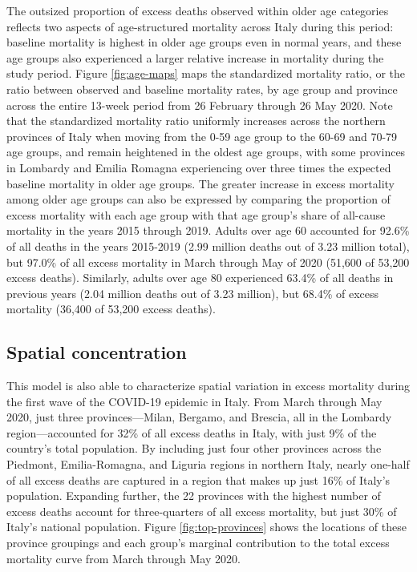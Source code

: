 \documentclass[
]{article}
\begin{document}
The outsized proportion of excess deaths observed within older age categories reflects two aspects of age-structured mortality across Italy during this period: baseline mortality is highest in older age groups even in normal years, and these age groups also experienced a larger relative increase in mortality during the study period. Figure \ref{fig:age-maps} maps the standardized mortality ratio, or the ratio between observed and baseline mortality rates, by age group and province across the entire 13-week period from 26 February through 26 May 2020. Note that the standardized mortality ratio uniformly increases across the northern provinces of Italy when moving from the 0-59 age group to the 60-69 and 70-79 age groups, and remain heightened in the oldest age groups, with some provinces in Lombardy and Emilia Romagna experiencing over three times the expected baseline mortality in older age groups. The greater increase in excess mortality among older age groups can also be expressed by comparing the proportion of excess mortality with each age group with that age group's share of all-cause mortality in the years 2015 through 2019. Adults over age 60 accounted for 92.6\% of all deaths in the years 2015-2019 (2.99 million deaths out of 3.23 million total), but 97.0\% of all excess mortality in March through May of 2020 (51,600 of 53,200 excess deaths). Similarly, adults over age 80 experienced 63.4\% of all deaths in previous years (2.04 million deaths out of 3.23 million), but 68.4\% of excess mortality (36,400 of 53,200 excess deaths).

\hypertarget{spatial-concentration}{%
\subsection{Spatial concentration}\label{spatial-concentration}}

This model is also able to characterize spatial variation in excess mortality during the first wave of the COVID-19 epidemic in Italy. From March through May 2020, just three provinces---Milan, Bergamo, and Brescia, all in the Lombardy region---accounted for 32\% of all excess deaths in Italy, with just 9\% of the country's total population. By including just four other provinces across the Piedmont, Emilia-Romagna, and Liguria regions in northern Italy, nearly one-half of all excess deaths are captured in a region that makes up just 16\% of Italy's population. Expanding further, the 22 provinces with the highest number of excess deaths account for three-quarters of all excess mortality, but just 30\% of Italy's national population. Figure \ref{fig:top-provinces} shows the locations of these province groupings and each group's marginal contribution to the total excess mortality curve from March through May 2020.
\end{document}
